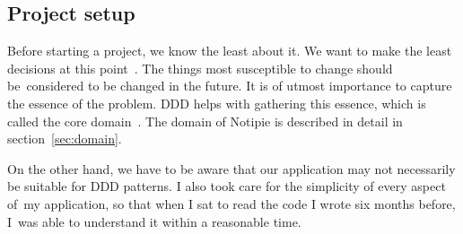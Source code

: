 \subsection{Project setup}\label{sec:project-setup}

Before starting a project,
we know the least about it.
We want to make the least decisions
at this point~\cite{beck_extreme_2004,erder_principle_2016}.
The things most susceptible to change
should be~considered to be changed in the future.
It is of utmost importance to capture
the essence of the problem.
\Ac{DDD} helps with
gathering this essence,
which is called
the core domain~\cite{millett_patterns_2015}.
The domain of Notipie is described in detail
in section~\ref{sec:domain}.

On the other hand,
we have to be aware that our application
may not necessarily be suitable for \ac{DDD} patterns.
I also took care for the simplicity
of every aspect of~my application,
so that when I sat to read the code
I wrote six months before,
I~was able to understand it
within a reasonable time.
